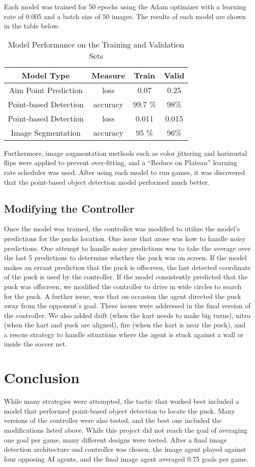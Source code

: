 \documentclass[11pt,a4paper]{article}
\begin{document}
Each model was trained for 50 epochs using the Adam optimizer with a learning rate of 0.005 and a batch size of 50 images.  The results of each model are shown in the table below. 
\begin{table}[h!]
\centering
\begin{tabular}{||c c c c||} 
 \hline
 Model Type & Measure & Train & Valid  \\ [0.5ex] 
 \hline\hline
 Aim Point Prediction  & loss & 0.07 & 0.25 \\
 Point-based Detection  & accuracy & 99.7 \% & 98\% \\
 Point-based Detection &  loss & 0.011 & 0.015 \\
  Image Segmentation  & accuracy & 95 \% & 96\% \\[1ex] 
 \hline
\end{tabular}
\caption{Model Performance on the Training and Validation Sets}
\label{table:1}
\end{table}
Furthermore, image augmentation methods such as color jittering and horizontal flips were applied to prevent over-fitting, and a “Reduce on Plateau” learning rate scheduler was used. After using each model to run games, it was discovered that the point-based object detection model performed much better.


\subsection{Modifying the Controller}

Once the model was trained, the controller was modified to utilize the model's predictions for the pucks location. One issue that arose was how to handle noisy predictions. One attempt to handle noisy predictions was to take the average over the last 5 predictions to determine whether the puck was on screen. If the model makes an errant prediction that the puck is offscreen, the last detected coordinate of the puck is used by the controller. If the model consistently predicted that the puck was offscreen, we modified the controller to drive in wide circles to search for the puck. A further issue, was that on occasion the agent directed the puck away from the opponent's goal. These issues were addressed in the final version of the controller. We also added drift (when the kart needs to make big turns), nitro (when the kart and puck are aligned), fire (when the kart is near the puck), and a rescue strategy to handle situations where the agent is stuck against a wall or inside the soccer net. 

\section{Conclusion}

While many strategies were attempted, the tactic that worked best included a model that performed point-based object detection to locate the puck. Many versions of the controller were also tested, and the best one included the modifications listed above. While this project did not reach the goal of averaging one goal per game, many different designs were tested. After a final image detection architecture and controller was chosen, the image agent played against four opposing AI agents, and the final image agent averaged 0.75 goals per game.
\end{document}
